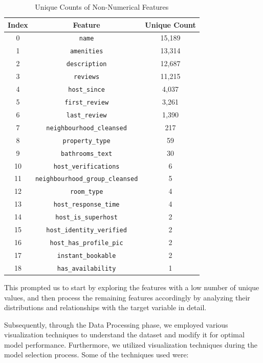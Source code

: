 \documentclass[12pt]{article}
\begin{document}
\begin{table}[H]
\centering
\begin{tabular}{|c|c|c|}
\hline
\rowcolor[HTML]{C0C0C0}
\textbf{Index} & \textbf{Feature} & \textbf{Unique Count} \\ \hline
0 & \texttt{name} & 15,189 \\ \hline
1 & \texttt{amenities} & 13,314 \\ \hline
2 & \texttt{description} & 12,687 \\ \hline
3 & \texttt{reviews} & 11,215 \\ \hline
4 & \texttt{host\_since} & 4,037 \\ \hline
5 & \texttt{first\_review} & 3,261 \\ \hline
6 & \texttt{last\_review} & 1,390 \\ \hline
7 & \texttt{neighbourhood\_cleansed} & 217 \\ \hline
8 & \texttt{property\_type} & 59 \\ \hline
9 & \texttt{bathrooms\_text} & 30 \\ \hline
10 & \texttt{host\_verifications} & 6 \\ \hline
11 & \texttt{neighbourhood\_group\_cleansed} & 5 \\ \hline
12 & \texttt{room\_type} & 4 \\ \hline
13 & \texttt{host\_response\_time} & 4 \\ \hline
14 & \texttt{host\_is\_superhost} & 2 \\ \hline
15 & \texttt{host\_identity\_verified} & 2 \\ \hline
16 & \texttt{host\_has\_profile\_pic} & 2 \\ \hline
17 & \texttt{instant\_bookable} & 2 \\ \hline
18 & \texttt{has\_availability} & 1 \\ \hline
\end{tabular}
\caption{Unique Counts of Non-Numerical Features}
\label{tab:unique_counts}
\end{table}

This prompted us to start by exploring the features with a low number of unique values, and then process the remaining features accordingly by analyzing their distributions and relationships with the target variable in detail.

Subsequently, through the Data Processing phase, we employed various visualization techniques to understand the dataset and modify it for optimal model performance. Furthermore, we utilized visualization techniques during the model selection process. Some of the techniques used were:
\end{document}
